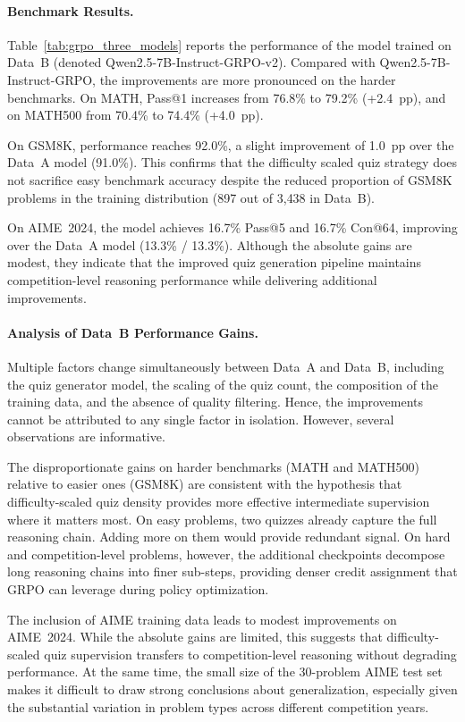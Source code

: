 \documentclass[12pt]{report}
\begin{document}
\paragraph{Benchmark Results.}
Table~\ref{tab:grpo_three_models} reports the performance of the model trained on Data~B (denoted Qwen2.5-7B-Instruct-GRPO-v2). Compared with Qwen2.5-7B-Instruct-GRPO, the improvements are more pronounced on the harder benchmarks. On MATH, Pass@1 increases from 76.8\% to 79.2\% (+2.4~pp), and on MATH500 from 70.4\% to 74.4\% (+4.0~pp). 

On GSM8K, performance reaches 92.0\%, a slight improvement of 1.0~pp over the Data~A model (91.0\%). This confirms that the difficulty scaled quiz strategy does not sacrifice easy benchmark accuracy despite the reduced proportion of GSM8K problems in the training distribution (897 out of 3{,}438 in Data~B).

On AIME~2024, the model achieves 16.7\% Pass@5 and 16.7\% Con@64,
improving over the Data~A model (13.3\% / 13.3\%). Although the absolute
gains are modest, they indicate that the improved quiz generation pipeline
maintains competition-level reasoning performance while delivering
additional improvements.

\paragraph{Analysis of Data~B Performance Gains.}
Multiple factors change simultaneously between Data~A and Data~B, including the quiz generator model, the scaling of the quiz count, the composition of the training data, and the absence of quality filtering. Hence, the improvements cannot be attributed to any single factor in isolation. However, several observations are informative.

The disproportionate gains on harder benchmarks (MATH and MATH500) relative to easier ones (GSM8K) are consistent with the hypothesis that difficulty-scaled quiz density provides more effective intermediate supervision where it matters most. On easy problems, two quizzes already capture the full reasoning chain. Adding more on them would provide redundant signal. On hard and competition-level problems, however, the additional checkpoints decompose long reasoning chains into finer sub-steps, providing denser credit assignment that GRPO can leverage during policy optimization.

The inclusion of AIME training data leads to modest improvements on
AIME~2024. While the
absolute gains are limited, this suggests that difficulty-scaled quiz
supervision transfers to competition-level reasoning without degrading
performance. At the same time, the small size of the 30-problem AIME
test set makes it difficult to draw strong conclusions about
generalization, especially given the substantial variation in problem
types across different competition years.
\end{document}
